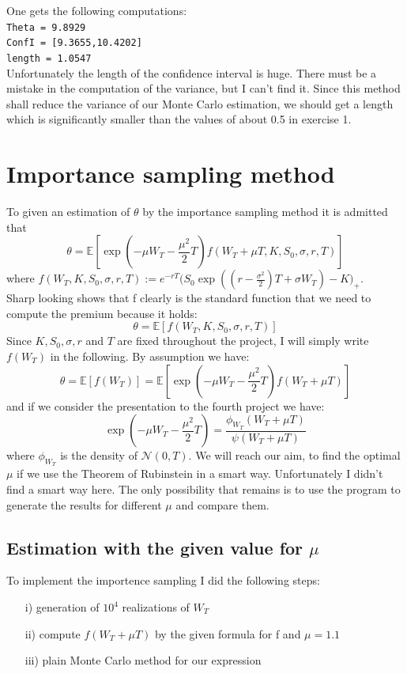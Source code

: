 \documentclass[12pt,a4paper]{scrartcl}
\begin{document}
\noindent One gets the following computations:\\
\texttt{Theta = 9.8929}\\
\texttt{ConfI = [9.3655,10.4202]}\\
\texttt{length = 1.0547}  \\

\noindent Unfortunately the length of the confidence interval is huge. There must be a mistake in the computation of the variance, but I can't find it. Since this method shall reduce the variance of our Monte Carlo estimation, we should get a length which is significantly smaller than the values of about 0.5 in exercise 1.

\section{Importance sampling method}
To given an estimation of $\theta$ by the importance sampling method it is admitted that 
\[
\theta = \mathbb{E}[\exp({- \mu W_T - \frac{\mu^2}{2} T}) f(W_T+ \mu T, K, S_0 , \sigma, r, T)]
\]
where $f(W_T,K,S_0,\sigma,r,T):= e^{-rT} (S_0 \exp{((r-\frac{\sigma^2}{2})T + \sigma W_T)-K)_+}$.\\

\noindent Sharp looking shows that f clearly is the standard function that we need to compute the premium because it holds:
\[
\theta = \mathbb{E}[f(W_T,K,S_0,\sigma,r,T)]
\]
Since $K,S_0,\sigma,r$ and $T$ are fixed throughout the project, I will simply write $f(W_T)$ in the following. By assumption we have:
\[
\theta = \mathbb{E}[f(W_T)] = \mathbb{E}[\exp{(- \mu W_T - \frac{\mu^2}{2} T)} f(W_T + \mu T)]
\]
and if we consider the presentation to the fourth project we have:
\[
\exp{(- \mu W_T - \frac{\mu^2}{2} T)} = \frac{\phi_{W_T}(W_T+\mu T)}{\psi(W_T+\mu T)}
\]
where $\phi_{W_T}$ is the density of $\mathcal{N}(0,T)$. We will reach our aim, to find the optimal $\mu$ if we use the Theorem of Rubinstein in a smart way. Unfortunately I didn't find a smart way here. The only possibility that remains is to use the program to generate the results for different $\mu$ and compare them.  

\subsection{Estimation with the given value for $\mu$}
To implement the importence sampling I did the following steps:
\begin{itemize}
\item[i)] generation of $10^4$ realizations of $W_T$
\item[ii)] compute $f(W_T+ \mu T)$ by the given formula for f and $\mu = 1.1$
\item[iii)] plain Monte Carlo method for our expression
\end{itemize}
\end{document}
